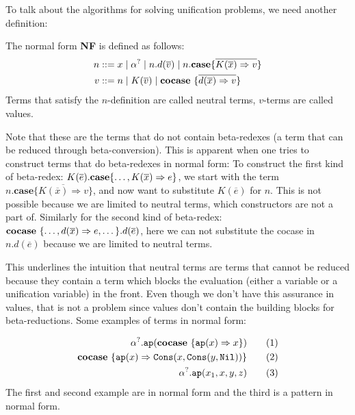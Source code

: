 \documentclass[twoside,12pt,a4paper]{article}
\begin{document}
To talk about the algorithms for solving unification problems, we need another definition: %
\begin{definition}
    The normal form \textbf{NF} is defined as follows:
    \begin{align*}
        n &::= x \;|\; \alpha^? \;|\; n.d(\overline{v})\;|\; n.\textbf{case}\{\overline{K(\overline{x})\Rightarrow v}\}\\
        v &::= n \;|\; K(\overline{v}) \;|\; \textbf{cocase}\ \{\overline{d(\overline{x})\Rightarrow v}\}
    \end{align*}
    Terms that satisfy the $n$-definition are called neutral terms, $v$-terms are called values.
\end{definition}
Note that these are the terms that do not contain beta-redexes (a term that can be reduced through beta-conversion).
This is apparent when one tries to construct terms that do beta-redexes in normal form: 
To construct the first kind of beta-redex: $K(\overline{e}).\textbf{case}\{\dots,K(\overline{x})\Rightarrow e\}$,
we start with the term $n.\textbf{case}\{\overline{K(\overline{x})\Rightarrow v}\}$, and now want to substitute $K(\overline{e})$ for $n$. 
This is not possible because we are limited to neutral terms, which constructors are not a part of.
Similarly for the second kind of beta-redex:
$\textbf{cocase}\ \{\dots,d(\overline{x}) \Rightarrow e, \dots\}.d(\overline{e})$, 
here we can not substitute the cocase in $n.d(\overline{e})$ because we are limited to neutral terms.
        
This underlines the intuition that neutral terms are terms that cannot be reduced because
they contain a term which blocks the evaluation (either a variable or a unification variable) in the front.
Even though we don't have this assurance in values, that is not a problem since values don't contain the building blocks for beta-reductions. 
Some examples of terms in normal form: 
\begin{example}
\begin{align*}
    \alpha^?.\texttt{ap}(\textbf{cocase}\ \{\texttt{ap}(x)\Rightarrow x\}) \tag{1}\\
    \textbf{cocase}\ \{\texttt{ap}(x)\Rightarrow \mathtt{Cons(\mathnormal{x}, Cons(\mathnormal{y}, Nil))}\} \tag{2}\\
    \alpha^?.\texttt{ap}(x_1, x, y, z) \tag{3}    
\end{align*}
The first and second example are in normal form and the third is a pattern in normal form.
\end{example}
\end{document}
